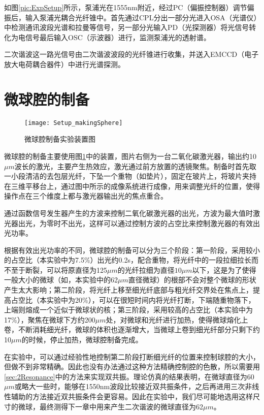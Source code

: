 如图\ref{pic:ExpSetup}所示，泵浦光在1555nm附近，经过PC（偏振控制器）调节偏振后，输入泵浦光耦合光纤锥中。首先通过CPL分出一部分光进入OSA（光谱仪）中检测通讯波段光谱和拉曼等信号，另一部分光输入PD（光探测器）将光信号转化为电信号最后输入OSC（示波器）进行，监测泵浦光的透射谱。

二次谐波这一路光信号由二次谐波波段的光纤锥进行收集，并送入EMCCD（电子放大电荷耦合器件）中进行光谱探测。

\section{微球腔的制备}

\begin{figure}
\centering
\texttt{[image: Setup\_makingSphere]}
\caption{微球腔制备实验装置图}
\label{pic:Setup_makingSphere}
\end{figure}

微球腔的制备主要使用图\ref{pic:Setup_makingSphere}中的装置，图片右侧为一台二氧化碳激光器，输出约10$\mu m$波长的激光，主要产生热效应，激光通过前方放置的透镜聚焦。制备时首先取一小段清洁的去包层光纤，下坠一个重物（如垫片），固定在玻片上，将玻片夹持在三维平移台上，通过图中所示的成像系统进行成像，用来调整光纤的位置，使得操作点在三个维度上都与激光器输出光的焦点重合。

通过函数信号发生器产生的方波来控制二氧化碳激光器的出光，方波为最大值时激光器出光，为零时不出光，这样可以通过控制方波的占空比来控制激光器的有效出光功率。

根据有效出光功率的不同，微球腔的制备可以分为三个阶段：第一阶段，采用较小的占空比（本实验中为7.5\%）出光约0.2s，配合重物，将光纤中的一段拉细拉长而不至于断裂，可以将原直径为125$\mu m$的光纤拉细为直径$10\mu m$以下，这是为了使得一般大小的微球（如，本实验中的62$\mu m$直径微球）的根部不会对整个微球的形状产生太大影响；第二阶段，将光纤上移至细光纤底部与粗光纤交界处在焦点上，提高占空比（本实验中为20\%），可以在很短时间内将光纤打断，下端随重物落下，上端则熔成一个近似于微球状的核；第三阶段，采用较高的占空比（本实验中为17\%），聚焦在微球下方约200$\mu m$处，对微球和光纤进行加热，使得微球熔化上卷，不断消耗细光纤，微球的体积也逐渐增大，当微球上卷到细光纤部分只剩下约10$\mu m$的时候，停止加热，微球腔制备完成。

在实验中，可以通过经验性地控制第二阶段打断细光纤的位置来控制球腔的大小，但做不到非常精确。因此也没有办法通过这种方法精确控制腔的色散，所以需要用\ref{sec:2Resonance}中的方法来实现双共振。理论仿真的结果表明，在微球直径为60$\mu m$或略大一些时，能够在1550nm波段比较接近双共振条件，之后再进用三次非线性辅助的方法接近双共振条件会更容易。因此在实验中，我们尽可能地选用这样尺寸的微球，最终测得下一章中用来产生二次谐波的微球直径为62$\mu m$。



